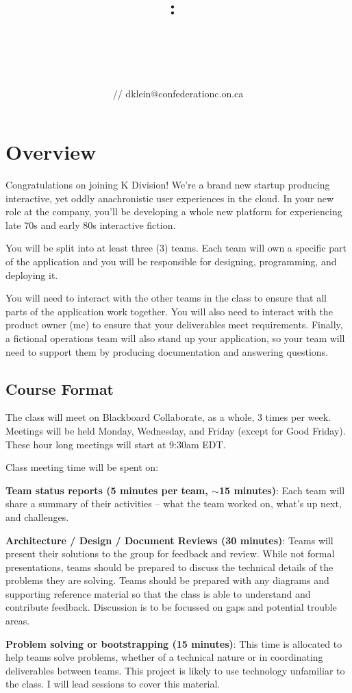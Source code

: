 \documentclass{article}
\title{
\vspace{2in}
\textmd{\textbf{\hmwkClass:\ \hmwkTitle}}\\
\normalsize\vspace{0.1in}\hmwkDueDate\\
\vspace{0.1in}\large{\textit{\hmwkClassInstructor\ \hmwkClassTime}}
\vspace{3in}
}
\author{\textbf{\hmwkAuthorName} // dklein@confederationc.on.ca}
\date{} %
\newcommand{\enterProblemHeader}[1]{
}
\newcommand{\exitProblemHeader}[1]{
\nobreak\extramarks{#1}{}\nobreak
}
\newcounter{homeworkProblemCounter} %
\newcommand{\homeworkProblemName}{}
\newenvironment{homeworkProblem}[1][Problem \arabic{homeworkProblemCounter}]{ %
\stepcounter{homeworkProblemCounter} %
\renewcommand{\homeworkProblemName}{#1} %
\section{\homeworkProblemName} %
\enterProblemHeader{\homeworkProblemName} %
}{
\exitProblemHeader{\homeworkProblemName} %
}
\newcommand{\homeworkSectionName}{}
\newenvironment{homeworkSection}[1]{ %
\renewcommand{\homeworkSectionName}{#1} %
\subsection{\homeworkSectionName} %
\enterProblemHeader{\homeworkProblemName\ [\homeworkSectionName]} %
}{
\enterProblemHeader{\homeworkProblemName} %
}
\begin{document}
\maketitle\thispagestyle{empty}
\tableofcontents
\newpage

\begin{homeworkProblem}[Overview]

  Congratulations on joining K Division! We're a brand new startup producing interactive, yet oddly anachronistic user experiences in the cloud. In your new role at the company, you'll be developing a whole new platform for experiencing late 70s and early 80s interactive fiction.
	
	You will be split into at least three (3) teams. Each team will own a specific part of the application and you will be responsible for designing, programming, and deploying it. 
	
	You will need to interact with the other teams in the class to ensure that all parts of the application work together. You will also need to interact with the product owner (me) to ensure that your deliverables meet requirements. Finally, a fictional operations team will also stand up your application, so your team will need to support them by producing documentation and answering questions.

\begin{homeworkSection}{Course Format}
  The class will meet on Blackboard Collaborate, as a whole, 3 times per week. Meetings will be held Monday, Wednesday, and Friday (except for Good Friday). These hour long meetings will start at 9:30am EDT.
	
	Class meeting time will be spent on:
	\begin{compactitem}
		\item \textbf{Team status reports (5 minutes per team, $\sim$15 minutes)}: Each team will share a summary of their activities -- what the team worked on, what's up next, and challenges.
		\item \textbf{Architecture / Design / Document Reviews (30 minutes)}: Teams will present their solutions to the group for feedback and review. While not formal presentations, teams should be prepared to discuss the technical details of the problems they are solving. Teams should be prepared with any diagrams and supporting reference material so that the class is able to understand and contribute feedback. Discussion is to be focussed on gaps and potential trouble areas.
		\item \textbf{Problem solving or bootstrapping (15 minutes)}: 	This time is allocated to help teams solve problems, whether of a technical nature or in coordinating deliverables between teams. This project is likely to use technology unfamiliar to the class. I will lead sessions to cover this material.
	\end{compactitem}


\end{homeworkSection}
\end{homeworkProblem}
\end{document}
